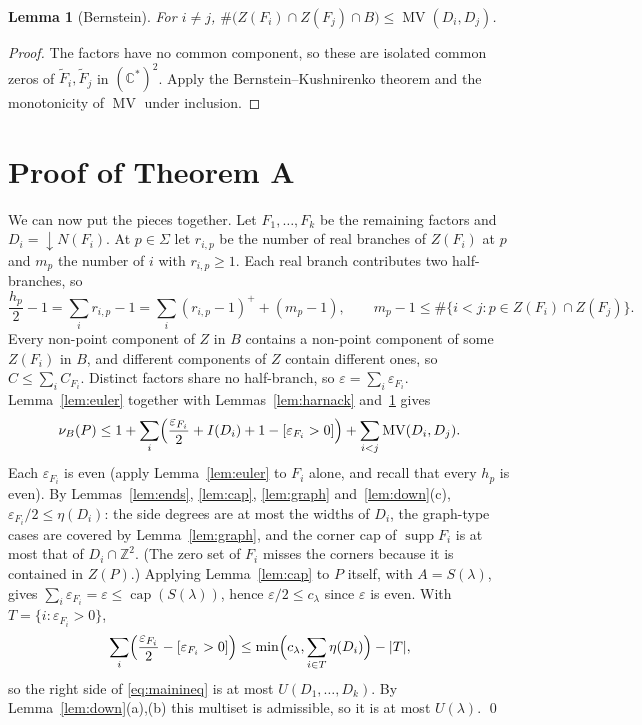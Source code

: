 \documentclass[11pt]{amsart}
\newtheorem{lemma}[theorem]{Lemma}
\theoremstyle{definition}
\theoremstyle{remark}
\newcommand{\C}{\mathbb{C}}
\newcommand{\Z}{\mathbb{Z}}
\newcommand{\MV}{\operatorname{MV}}
\newcommand{\capn}{\operatorname{cap}}
\newcommand{\supp}{\operatorname{supp}}
\newcommand{\down}{{\downarrow}}
\numberwithin{equation}{section}
\begin{document}
\begin{lemma}[Bernstein]\label{lem:bernstein}
For $i\ne j$, $\#\bigl(Z(F_i)\cap Z(F_j)\cap B\bigr)\le\MV(D_i,D_j)$.
\end{lemma}

\begin{proof}
The factors have no common component, so these are isolated common zeros of
$\tilde F_i,\tilde F_j$ in $(\C^*)^2$. Apply the Bernstein--Kushnirenko theorem
\cite{Bernstein,Kushnirenko} and the monotonicity of $\MV$ under inclusion.
\end{proof}

\section{Proof of Theorem A}\label{sec:proofA}

We can now put the pieces together.
Let $F_1,\dots,F_k$ be the remaining factors and $D_i=\down N(F_i)$. At $p\in\Sigma$ let
$r_{i,p}$ be the number of real branches of $Z(F_i)$ at $p$ and $m_p$ the number of $i$ with
$r_{i,p}\ge1$. Each real branch contributes two half-branches, so
\[
\frac{h_p}{2}-1=\sum_ir_{i,p}-1=\sum_i(r_{i,p}-1)^++(m_p-1),\qquad
m_p-1\le\#\{i<j:p\in Z(F_i)\cap Z(F_j)\}.
\]
Every non-point component of $Z$ in $B$ contains a non-point component of some $Z(F_i)$ in
$B$, and different components of $Z$ contain different ones, so $C\le\sum_iC_{F_i}$. Distinct
factors share no half-branch, so $\varepsilon=\sum_i\varepsilon_{F_i}$. Lemma~\ref{lem:euler}
together with Lemmas~\ref{lem:harnack} and~\ref{lem:bernstein} gives
\begin{equation}\label{eq:mainineq}
\nu_B(P)\le1+\sum_i\Bigl(\frac{\varepsilon_{F_i}}{2}+I(D_i)+1-[\varepsilon_{F_i}>0]\Bigr)
+\sum_{i<j}\MV(D_i,D_j).
\end{equation}
Each $\varepsilon_{F_i}$ is even (apply Lemma~\ref{lem:euler} to $F_i$ alone, and recall that
every $h_p$ is even). By
Lemmas~\ref{lem:ends}, \ref{lem:cap}, \ref{lem:graph} and~\ref{lem:down}(c),
$\varepsilon_{F_i}/2\le\eta(D_i)$: the side degrees are at most the widths of $D_i$, the
graph-type cases are covered by Lemma~\ref{lem:graph}, and the corner cap of $\supp F_i$ is at
most that of $D_i\cap\Z^2$. (The zero set of $F_i$ misses the corners because it is contained
in $Z(P)$.) Applying Lemma~\ref{lem:cap} to $P$ itself, with $A=S(\lambda)$, gives
$\sum_i\varepsilon_{F_i}=\varepsilon\le\capn(S(\lambda))$, hence
$\varepsilon/2\le c_\lambda$ since $\varepsilon$ is even. With $T=\{i:\varepsilon_{F_i}>0\}$,
\[
\sum_i\Bigl(\frac{\varepsilon_{F_i}}{2}-[\varepsilon_{F_i}>0]\Bigr)
\le\min\Bigl(c_\lambda,\sum_{i\in T}\eta(D_i)\Bigr)-|T|,
\]
so the right side of \eqref{eq:mainineq} is at most $U(D_1,\dots,D_k)$. By
Lemma~\ref{lem:down}(a),(b) this multiset is admissible, so it is at most $U(\lambda)$.
\qed
\end{document}
